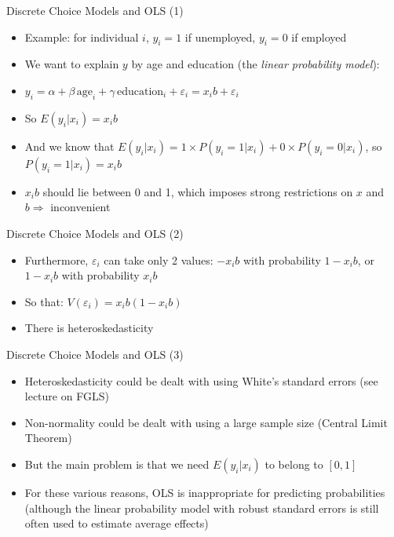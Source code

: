 \documentclass[aspectratio=169]{beamer}
\begin{document}
\begin{frame}{Discrete Choice Models and OLS (1)}
\begin{itemize}
    \item Example: for individual $i$, $y_i = 1$ if unemployed, $y_i = 0$ if employed
    \item We want to explain $y$ by age and education (the \textit{linear probability model}):
    \item $y_i = \alpha + \beta\,\text{age}_i + \gamma\,\text{education}_i + \varepsilon_i = x_i b + \varepsilon_i$
    \item So $E(y_i|x_i) = x_i b$
    \item And we know that $E(y_i|x_i) = 1 \times P(y_i = 1|x_i) + 0 \times P(y_i = 0|x_i)$, so $P(y_i = 1|x_i) = x_i b$
    \item $x_i b$ should lie between 0 and 1, which imposes strong restrictions on $x$ and $b \Rightarrow$ inconvenient
\end{itemize}
\end{frame}

\begin{frame}{Discrete Choice Models and OLS (2)}
\begin{itemize}
    \item Furthermore, $\varepsilon_i$ can take only 2 values: $-x_i b$ with probability $1 - x_i b$, or $1 - x_i b$ with probability $x_i b$
    \item So that: $V(\varepsilon_i) = x_i b(1 - x_i b)$
    \item There is heteroskedasticity
\end{itemize}
\end{frame}

\begin{frame}{Discrete Choice Models and OLS (3)}
\begin{itemize}
    \item Heteroskedasticity could be dealt with using White's standard errors (see lecture on FGLS)
    \item Non-normality could be dealt with using a large sample size (Central Limit Theorem)
    \item But the main problem is that we need $E(y_i|x_i)$ to belong to $[0,1]$
    \item For these various reasons, OLS is inappropriate for predicting probabilities (although the linear probability model with robust standard errors is still often used to estimate average effects)
\end{itemize}
\end{frame}
\end{document}

